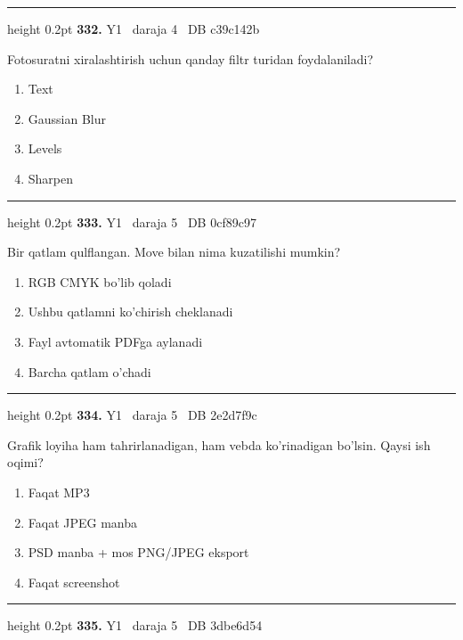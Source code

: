 \documentclass[10pt,a4paper,oneside]{article}
\begin{document}
\vspace{2mm}\hrule height 0.2pt \vspace{4mm}
\hypertarget{q332}{\textbf{\color{ink}332.}}  {\color{muted}\scriptsize Y1 \textbullet\ daraja 4 \textbullet\ DB c39c142b}
\par
Fotosuratni xiralashtirish uchun qanday filtr turidan foydalaniladi?
\begin{enumerate}[label=\Alph*),leftmargin=9mm]
\item Text
\item Gaussian Blur
\item Levels
\item Sharpen
\end{enumerate}
\vspace{2mm}\hrule height 0.2pt \vspace{4mm}
\hypertarget{q333}{\textbf{\color{ink}333.}}  {\color{muted}\scriptsize Y1 \textbullet\ daraja 5 \textbullet\ DB 0cf89c97}
\par
Bir qatlam qulflangan. Move bilan nima kuzatilishi mumkin?
\begin{enumerate}[label=\Alph*),leftmargin=9mm]
\item RGB CMYK bo'lib qoladi
\item Ushbu qatlamni ko'chirish cheklanadi
\item Fayl avtomatik PDFga aylanadi
\item Barcha qatlam o'chadi
\end{enumerate}
\vspace{2mm}\hrule height 0.2pt \vspace{4mm}
\hypertarget{q334}{\textbf{\color{ink}334.}}  {\color{muted}\scriptsize Y1 \textbullet\ daraja 5 \textbullet\ DB 2e2d7f9c}
\par
Grafik loyiha ham tahrirlanadigan, ham vebda ko'rinadigan bo'lsin. Qaysi ish oqimi?
\begin{enumerate}[label=\Alph*),leftmargin=9mm]
\item Faqat MP3
\item Faqat JPEG manba
\item PSD manba + mos PNG/JPEG eksport
\item Faqat screenshot
\end{enumerate}
\vspace{2mm}\hrule height 0.2pt \vspace{4mm}
\hypertarget{q335}{\textbf{\color{ink}335.}}  {\color{muted}\scriptsize Y1 \textbullet\ daraja 5 \textbullet\ DB 3dbe6d54}
\end{document}
